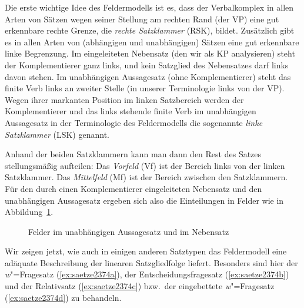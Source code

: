 Die erste wichtige Idee des Feldermodells ist es, dass der Verbalkomplex in allen Arten von Sätzen wegen seiner Stellung am rechten Rand (der VP) eine gut erkennbare rechte Grenze, die \textit{rechte Satzklammer} (RSK), bildet.
Zusätzlich gibt es in allen Arten von (abhängigen und unabhängigen) Sätzen eine gut erkennbare linke Begrenzung.
Im eingeleiteten Nebensatz (den wir als KP analysieren) steht der Komplementierer ganz links, und kein Satzglied des Nebensatzes darf links davon stehen.
Im unabhängigen Aussagesatz (ohne Komplementierer) steht das finite Verb links an zweiter Stelle (in unserer Terminologie links von der VP).
Wegen ihrer markanten Position im linken Satzbereich werden der Komplementierer und das links stehende finite Verb im unabhängigen Aussagesatz in der Terminologie des Feldermodells die sogenannte \textit{linke Satzklammer} (LSK) genannt.

Anhand der beiden Satzklammern kann man dann den Rest des Satzes stellungsmäßig aufteilen:
Das \textit{Vorfeld} (Vf) ist der Bereich links von der linken Satzklammer.
Das \textit{Mittelfeld} (Mf) ist der Bereich zwischen den Satzklammern.
Für den durch einen Komplementierer eingeleiteten Nebensatz und den unabhängigen Aussagesatz ergeben sich also die Einteilungen in Felder wie in Abbildung~\ref{fig:felder1}.

\begin{figure}
  \caption{Felder im unabhängigen Aussagesatz und im Nebensatz}
  \label{fig:felder1}
\end{figure}


Wir zeigen jetzt, wie auch in einigen anderen Satztypen das Feldermodell eine adäquate Beschreibung der linearen Satzgliedfolge liefert.
Besonders sind hier der \textit{w}"=Fragesatz (\ref{ex:saetze2374a}), der Entscheidungsfragesatz (\ref{ex:saetze2374b}) und der Relativsatz (\ref{ex:saetze2374c}) bzw.\ der eingebettete \textit{w}"=Fragesatz (\ref{ex:saetze2374d}) zu behandeln.

